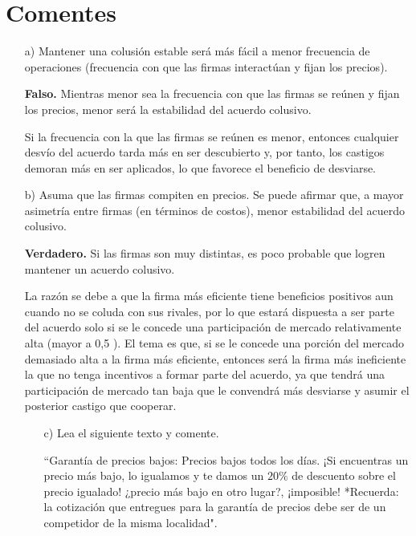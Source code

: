 \section{Comentes}
\begin{itemize}
    \item[a)] Mantener una colusión estable será más fácil a menor frecuencia de operaciones (frecuencia con que las firmas interactúan y fijan los precios).
    \begin{solution}
        \textbf{Falso.} Mientras menor sea la frecuencia con que las firmas se reúnen y fijan los precios, menor será la estabilidad del acuerdo colusivo.
        
        Si la frecuencia con la que las firmas se reúnen es menor, entonces cualquier desvío del acuerdo tarda más en ser descubierto y, por tanto, los castigos demoran más en ser aplicados, lo que favorece el beneficio de desviarse.
    \end{solution}
    \item[b)] Asuma que las firmas compiten en precios. Se puede afirmar que, a mayor asimetría entre firmas (en términos de costos), menor estabilidad del acuerdo colusivo.
    \begin{solution}
        \textbf{Verdadero.} Si las firmas son muy distintas, es poco probable que logren mantener un acuerdo colusivo.
        
        La razón se debe a que la firma más eficiente tiene beneficios positivos aun cuando no se coluda con sus rivales, por lo que estará dispuesta a ser parte del acuerdo solo si se le concede una participación de mercado relativamente alta (mayor a 0,5 ). El tema es que, si se le concede una porción del mercado demasiado alta a la firma más eficiente, entonces será la firma más ineficiente la que no tenga incentivos a formar parte del acuerdo, ya que tendrá una participación de mercado tan baja que le convendrá más desviarse y asumir el posterior castigo que cooperar.
    \end{solution}
    \begin{itemize}

    \item[c)] Lea el siguiente texto y comente.
    
    ``Garantía de precios bajos: Precios bajos todos los días. ¡Si encuentras un precio más bajo, lo igualamos y te damos un $20\%$ de descuento sobre el precio igualado! ¿precio más bajo en otro lugar?, ¡imposible! *Recuerda: la cotización que entregues para la garantía de precios debe ser de un competidor de la misma localidad".


\end{itemize}
\end{itemize}
